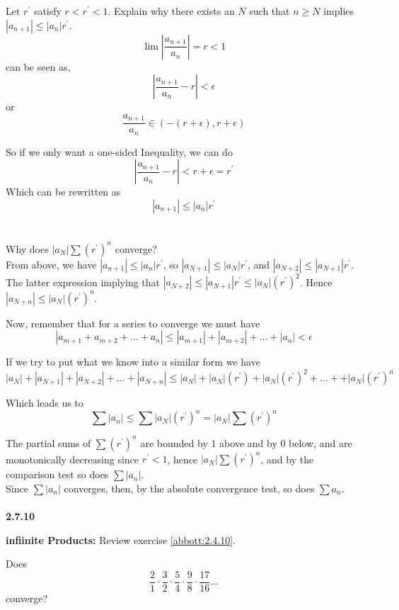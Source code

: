 Let $r^{\prime}$ satisfy $r < r^{\prime} < 1$.
Explain why there exists an $N$ such that $n\geq N$
implies $|a_{n+1}| \leq |a_n|r^{\prime}$.
\\

$$
\lim \left| \frac{a_{n+1}}{a_n} \right| = r < 1
$$
can be seen as,
$$
\left| \frac{a_{n+1}}{a_n} - r \right| < \epsilon
$$
or
$$
\frac{a_{n+1}}{a_n} \in (-(r+\epsilon), r+\epsilon)
$$

So if we only want a one-sided Inequality, we can do
$$
\left| \frac{a_{n+1}}{a_n} - r \right| < r+\epsilon = r^{\prime}
$$
Which can be rewritten as
$$
| a_{n+1} | \leq | a_n | r^{\prime}
$$
\\~\\

Why does $|a_N| \sum (r^{\prime})^n$ converge?
\\

From above, we have $| a_{n+1} | \leq | a_n | r^{\prime}$,
so $|a_{N+1}| \leq |a_N|r^{\prime}$, and $|a_{N+2}| \leq |a_{N+1}|r^{\prime}$.
The latter expression implying that $|a_{N+2}| \leq |a_{N+1}|r^{\prime} \leq |a_N|(r^{\prime})^2$.
Hence $|a_{N+n}| \leq |a_N| (r^{\prime})^n$.

Now, remember that for a series to converge we must have
$$
|a_{m+1} + a_{m+2} + \ldots + a_n| \leq |a_{m+1}| + |a_{m+2}| + \ldots + |a_n| < \epsilon
$$

If we try to put what we know into a similar form we have
$$
|a_N| + |a_{N+1}| + |a_{N+2}| + \ldots + |a_{N+n}| \leq
|a_N| + |a_N|(r^{\prime}) + |a_N|(r^{\prime})^2 + \ldots + + |a_N|(r^{\prime})^n 
$$

Which leads us to
$$
\sum |a_n| \leq \sum |a_N| (r^{\prime})^n = |a_N| \sum (r^{\prime})^n
$$

The partial sums of $\sum (r^\prime)^n$ are bounded by 1 above and by 0 below, and are
monotonically decreasing since $r^\prime < 1$, hence $|a_N| \sum (r^{\prime})^n$, and by the
comparison test so does $\sum |a_n|$.
\\

Since $\sum |a_n|$ converges, then, by the absolute convergence test, so does $\sum a_n$.
\\~\\



\textbf{2.7.10}

\textbf{infiinite Products:} Review exercise \ref{abbott:2.4.10}.

Does
$$
\frac{2}{1}\cdot \frac{3}{2}\cdot \frac{5}{4}\cdot \frac{9}{8}\cdot \frac{17}{16} \ldots
$$
converge?
\\
